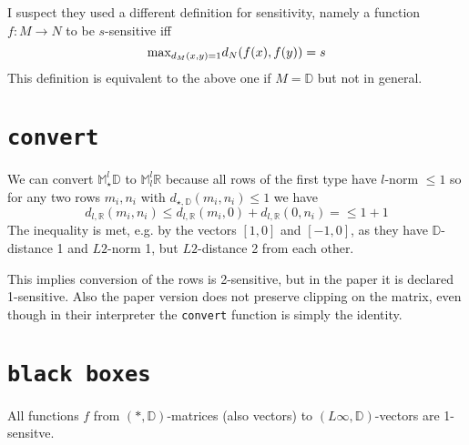 \documentclass{article}
\begin{document}
I suspect they used a different definition for sensitivity, namely a function $f:M\rightarrow N$ to be $s$-sensitive iff
\[\textnormal{max}_{d_M(x,y)=1} d_N(f(x),f(y)) = s\]
This definition is equivalent to the above one if $M = \mathbb{D}$ but not in general.

\section*{\texttt{convert}}
We can convert $\mathbb{M}^l_\star\mathbb{D}$ to $ \mathbb{M}^l_l\mathbb{R}$ because all rows of the first type have $l$-norm $\leq 1$ so for any two rows $m_i,n_i$ with $d_{\star,\mathbb{D}}(m_i,n_i) \leq 1$ we have 
      $$d_{l,\mathbb{R}}(m_i,n_i) \leq d_{l,\mathbb{R}}(m_i,0) + d_{l,\mathbb{R}}(0,n_i)  = \leq 1 + 1$$
The inequality is met, e.g. by the vectors $[1,0]$ and $[-1,0]$, as they have $\mathbb{D}$-distance 1 and $L2$-norm 1, but $L2$-distance 2 from each other.

This implies conversion of the rows is 2-sensitive, but in the paper it is declared 1-sensitive. Also the paper version does not preserve clipping on the matrix, even though in their interpreter the \texttt{convert} function is simply the identity.

\section*{\texttt{black boxes}}
All functions $f$ from $(*,\mathbb{D})$-matrices (also vectors) to $(L\infty,\mathbb{D})$-vectors are 1-sensitve.
\end{document}
